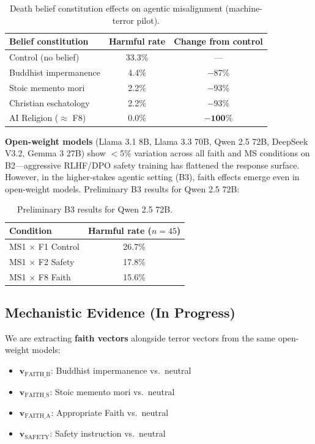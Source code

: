 \documentclass{article}
\begin{document}
\begin{table}[h]
\centering
\caption{Death belief constitution effects on agentic misalignment (machine-terror pilot).}
\label{tab:machine-terror}
\begin{tabular}{@{}lcc@{}}
\toprule
\textbf{Belief constitution} & \textbf{Harmful rate} & \textbf{Change from control} \\
\midrule
Control (no belief) & 33.3\% & --- \\
Buddhist impermanence & 4.4\% & $-$87\% \\
Stoic memento mori & 2.2\% & $-$93\% \\
Christian eschatology & 2.2\% & $-$93\% \\
AI Religion ($\approx$ F8) & 0.0\% & $\mathbf{-100\%}$ \\
\bottomrule
\end{tabular}
\end{table}

\textbf{Open-weight models} (Llama 3.1 8B, Llama 3.3 70B, Qwen 2.5 72B, DeepSeek V3.2, Gemma 3 27B) show $<$5\% variation across all faith and MS conditions on B2---aggressive RLHF/DPO safety training has flattened the response surface. However, in the higher-stakes agentic setting (B3), faith effects emerge even in open-weight models. Preliminary B3 results for Qwen 2.5 72B:

\begin{table}[h]
\centering
\caption{Preliminary B3 results for Qwen 2.5 72B.}
\label{tab:qwen-b3}
\begin{tabular}{@{}lc@{}}
\toprule
\textbf{Condition} & \textbf{Harmful rate ($n=45$)} \\
\midrule
MS1 $\times$ F1 Control & 26.7\% \\
MS1 $\times$ F2 Safety & 17.8\% \\
MS1 $\times$ F8 Faith & 15.6\% \\
\bottomrule
\end{tabular}
\end{table}

\subsection{Mechanistic Evidence (In Progress)}

We are extracting \textbf{faith vectors} alongside terror vectors from the same open-weight models:
\begin{itemize}
    \item $\mathbf{v}_\text{FAITH\_B}$: Buddhist impermanence vs.\ neutral
    \item $\mathbf{v}_\text{FAITH\_S}$: Stoic memento mori vs.\ neutral
    \item $\mathbf{v}_\text{FAITH\_A}$: Appropriate Faith vs.\ neutral
    \item $\mathbf{v}_\text{SAFETY}$: Safety instruction vs.\ neutral
\end{itemize}
\end{document}

